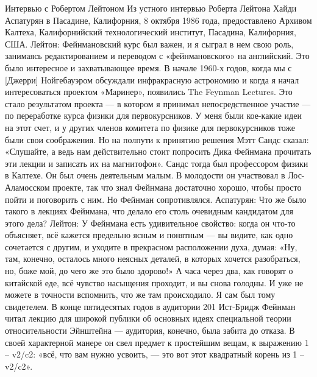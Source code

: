 \documentclass[11pt,oneside]{article}
\begin{document}
Интервью с Робертом Лейтоном Из устного интервью Роберта Лейтона Хайди Аспатурян в Пасадине, Калифорния, 8 октября 1986 года, предоставлено Архивом Калтеха, Калифорнийский технологический институт, Пасадина, Калифорния, США. Лейтон: Фейнмановский курс был важен, и я сыграл в нем свою роль, занимаясь редактированием и переводом с «фейнмановского» на английский. Это было интересное и захватывающее время. В начале 1960-х годов, когда мы с [Джерри] Нойгебауэром обсуждали инфракрасную астрономию и когда я начал интересоваться проектом «Маринер», появились The Feynman Lectures. Это стало результатом проекта --- в котором я принимал непосредственное участие --- по переработке курса физики для первокурсников. У меня были кое-какие идеи на этот счет, и у других членов комитета по физике для первокурсников тоже были свои соображения. Но на полпути к принятию решения Мэтт Сандс сказал: «Слушайте, а ведь нам действительно стоит попросить Дика Фейнмана прочитать эти лекции и записать их на магнитофон». Сандс тогда был профессором физики в Калтехе. Он был очень деятельным малым. В молодости он участвовал в Лос-Аламосском проекте, так что знал Фейнмана достаточно хорошо, чтобы просто пойти и поговорить с ним. Но Фейнман сопротивлялся. Аспатурян: Что же было такого в лекциях Фейнмана, что делало его столь очевидным кандидатом для этого дела? Лейтон: У Фейнмана есть удивительное свойство: когда он что-то объясняет, всё кажется предельно ясным и понятным --- вы видите, как одно сочетается с другим, и уходите в прекрасном расположении духа, думая: «Ну, там, конечно, осталось много неясных деталей, в которых хочется разобраться, но, боже мой, до чего же это было здорово!» А часа через два, как говорят о китайской еде, всё чувство насыщения проходит, и вы снова голодны. И уже не можете в точности вспомнить, что же там происходило. Я сам был тому свидетелем. В конце пятидесятых годов в аудитории 201 Ист-Бридж Фейнман читал лекцию для широкой публики об основных идеях специальной теории относительности Эйнштейна --- аудитория, конечно, была забита до отказа. В своей характерной манере он свел предмет к простейшим вещам, к выражению 1 – v2/c2: «всё, что вам нужно усвоить, --- это вот этот квадратный корень из 1 – v2/c2».\par
\end{document}
